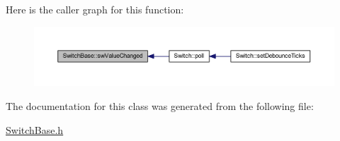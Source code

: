 Here is the caller graph for this function\+:
\nopagebreak
\begin{figure}[H]
\begin{center}
\leavevmode
\includegraphics[width=350pt]{d8/d8e/class_switch_base_a8dce83329bd9ce69e55d2f01115f3593_icgraph}
\end{center}
\end{figure}


The documentation for this class was generated from the following file\+:\begin{DoxyCompactItemize}
\item 
\hyperlink{_switch_base_8h}{Switch\+Base.\+h}\end{DoxyCompactItemize}

